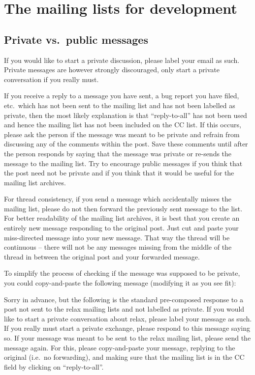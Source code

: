 
\section{The mailing lists for development}


\subsection{Private vs.\ public messages}

If you would like to start a private discussion, please label your email as such.
Private messages are however strongly discouraged, only start a private conversation if you really must.

If you receive a reply to a message you have sent, a bug report you have filed, etc.\ which has not been sent to the mailing list and has not been labelled as private, then the most likely explanation is that ``reply-to-all'' has not been used and hence the mailing list has not been included on the CC list.
If this occurs, please ask the person if the message was meant to be private and refrain from discussing any of the comments within the post.
Save these comments until after the person responds by saying that the message was private or re-sends the message to the mailing list.
Try to encourage public messages if you think that the post need not be private and if you think that it would be useful for the mailing list archives.

For thread consistency, if you send a message which accidentally misses the mailing list, please do not then forward the previously sent message to the list.
For better readability of the mailing list archives, it is best that you create an entirely new message responding to the original post.
Just cut and paste your miss-directed message into your new message.
That way the thread will be continuous -- there will not be any messages missing from the middle of the thread in between the original post and your forwarded message.

To simplify the process of checking if the message was supposed to be private, you could copy-and-paste the following message (modifying it as you see fit):

\begin{exampleenv}
Sorry in advance, but the following is the standard pre-composed response to a post not sent to the relax mailing lists and not labelled as private.  If you would like to start a private conversation about relax, please label your message as such.  If you really must start a private exchange, please respond to this message saying so.  If your message was meant to be sent to the relax mailing list, please send the message again.  For this, please copy-and-paste your message, replying to the original (i.e.\ no forwarding), and making sure that the mailing list is in the CC field by clicking on ``reply-to-all''.
\end{exampleenv}




